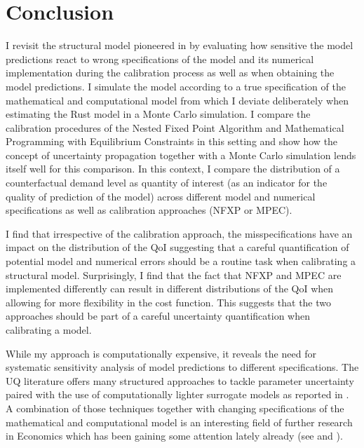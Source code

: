 \section{Conclusion} \label{conclusion}
\thispagestyle{plain} %

I revisit the structural model pioneered in \cite{Rust.1987} by evaluating how sensitive the model predictions react to wrong specifications of the model and its numerical implementation during the calibration process as well as when obtaining the model predictions. I simulate the model according to a true specification of the mathematical and computational model from which I deviate deliberately when estimating the Rust model in a Monte Carlo simulation. I compare the calibration procedures of the Nested Fixed Point Algorithm and Mathematical Programming with Equilibrium Constraints in this setting and show how the concept of uncertainty propagation together with a Monte Carlo simulation lends itself well for this comparison. In this context, I compare the distribution of a counterfactual demand level as quantity of interest (as an indicator for the quality of prediction of the model) across different model and numerical specifications as well as calibration approaches (NFXP or MPEC).

I find that irrespective of the calibration approach, the misspecifications have an impact on the distribution of the QoI suggesting that a careful quantification of potential model and numerical errors should be a routine task when calibrating a structural model. Surprisingly, I find that the fact that NFXP and MPEC are implemented differently can result in different distributions of the QoI when allowing for more flexibility in the cost function. This suggests that the two approaches should be part of a careful uncertainty quantification when calibrating a model.

While my approach is computationally expensive, it reveals the need for systematic sensitivity analysis of model predictions to different specifications. The UQ literature offers many structured approaches to tackle parameter uncertainty paired with the use of computationally lighter surrogate models as reported in \cite{Saltelli.2008}. A combination of those techniques together with changing specifications of the mathematical and computational model is an interesting field of further research in Economics which has been gaining some attention lately already (see \cite{Scheidegger.2019} and \cite{Harenberg.2019}).